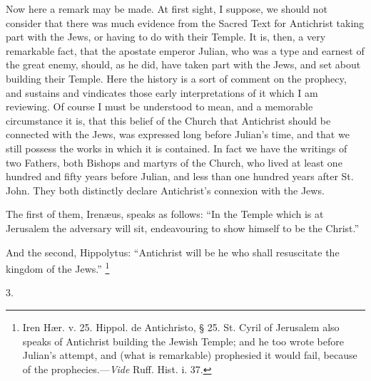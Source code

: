 Now here a remark may be made. At first sight, I suppose, we should
not consider that there was much evidence from the Sacred Text for
Antichrist taking part with the Jews, or having to do with their
Temple. It is, then, a very remarkable fact, that the apostate emperor
Julian, who was a type and earnest of the great enemy, should, as he
did, have taken part with the Jews, and set about building their
Temple. Here the history is a sort of comment on the prophecy, and
sustains and vindicates those early interpretations of it which I am
reviewing. Of course I must be understood to mean, and a memorable
circumstance it is, that this belief of the Church that Antichrist
should be connected with the Jews, was expressed long before Julian's
time, and that we still possess the works in which it is contained. In
fact we have the writings of two Fathers, both Bishops and martyrs of
the Church, who lived at least one hundred and fifty years before
Julian, and less than one hundred years after St. John. They both
distinctly declare Antichrist's connexion with the Jews.

The first of them, Irenæus, speaks as follows: ``In the Temple
which is at Jerusalem the adversary will sit, endeavouring to show
himself to be the Christ.''

And the second, Hippolytus: ``Antichrist will be he who shall
resuscitate the kingdom of the Jews.'' \footnote{Iren Hær. v. 25. Hippol. de Antichristo, § 25. St. Cyril of
Jerusalem also speaks of Antichrist building the Jewish Temple; and he
too wrote before Julian's attempt, and (what is remarkable) prophesied
it would fail, because of the prophecies.—\emph{Vide} Ruff. Hist. i.
37.}

3.


